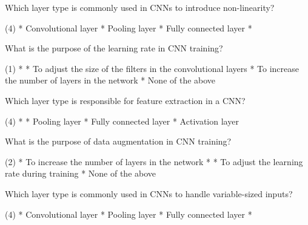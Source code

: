 \documentclass[10pt]{extarticle}
\begin{document}
\begin{exercise}
    Which layer type is commonly used in CNNs to introduce non-linearity?
    \begin{choice} (4)
        * Convolutional layer
        * Pooling layer
        * Fully connected layer
        * 
    \end{choice}
\end{exercise}
\begin{solution}
\end{solution}

\begin{exercise}
    What is the purpose of the learning rate in CNN training?
    \begin{choice} (1)
        * 
        * To adjust the size of the filters in the convolutional layers
        * To increase the number of layers in the network
        * None of the above
    \end{choice}
\end{exercise}
\begin{solution}
\end{solution}

\begin{exercise}
    Which layer type is responsible for feature extraction in a CNN?
    \begin{choice} (4)
        * 
        * Pooling layer
        * Fully connected layer
        * Activation layer
    \end{choice}
\end{exercise}
\begin{solution}
\end{solution}

\begin{exercise}
    What is the purpose of data augmentation in CNN training?
    \begin{choice} (2)
        * To increase the number of layers in the network
        * 
        * To adjust the learning rate during training
        * None of the above
    \end{choice}
\end{exercise}
\begin{solution}
\end{solution}

\begin{exercise}
    Which layer type is commonly used in CNNs to handle variable-sized inputs?
    \begin{choice} (4)
        * Convolutional layer
        * Pooling layer
        * Fully connected layer
        * 
    \end{choice}
\end{exercise}
\begin{solution}
\end{solution}
\end{document}
